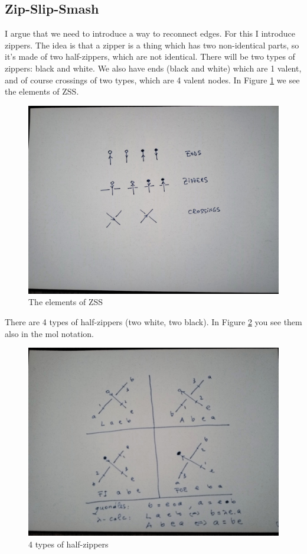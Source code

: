 \documentclass[]{article}
\begin{document}
\hypertarget{zip-slip-smash}{%
\subsection{Zip-Slip-Smash}\label{zip-slip-smash}}

I argue that we need to introduce a way to reconnect edges. For this I
introduce zippers. The idea is that a zipper is a thing which has two
non-identical parts, so it's made of two half-zippers, which are not
identical. There will be two types of zippers: black and white. We also
have ends (black and white) which are 1 valent, and of course crossings
of two types, which are 4 valent nodes. In Figure \ref{The-elements-of-ZSS} we see the elements of ZSS.

\begin{figure}[h!]
\centering
\includegraphics[width=0.75\linewidth]{img/3647.jpg}
\caption{The elements of ZSS}
\label{The-elements-of-ZSS}
\end{figure}

There are 4 types of half-zippers (two white, two black). In Figure \ref{4-types-of-half-zippers} you see
them also in the mol notation.

\begin{figure}[h!]
\centering
\includegraphics[width=0.75\linewidth]{img/3704.jpg}
\caption{4 types of half-zippers}
\label{4-types-of-half-zippers}
\end{figure}
\end{document}

